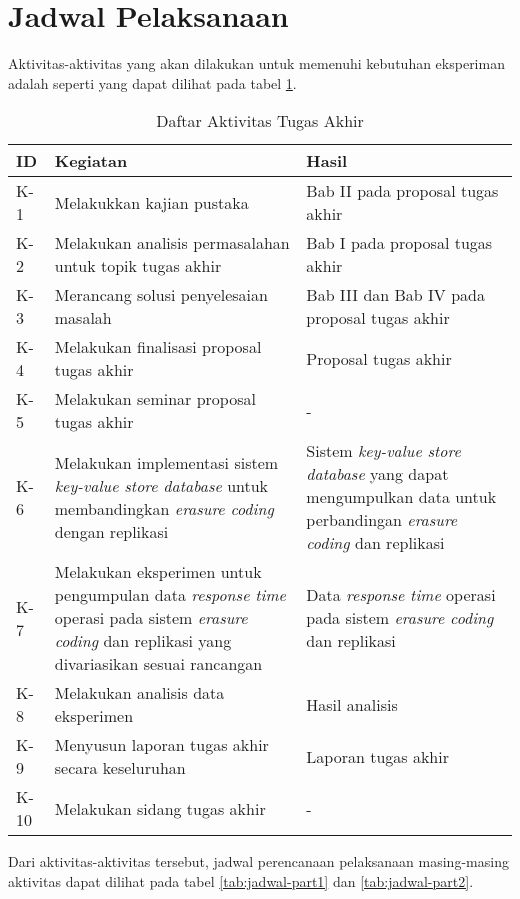 \section{Jadwal Pelaksanaan}
\label{sec:jadwal-pelaksanaan}
Aktivitas-aktivitas yang akan dilakukan untuk memenuhi kebutuhan eksperiman adalah seperti yang dapat dilihat pada tabel \ref{tab:rincian-aktivitas}.

\begin{table}[ht]
\centering
\caption{Daftar Aktivitas Tugas Akhir}
\begin{tabular}{|p{1cm}|p{6cm}|p{6cm}|}
\hline
\rowcolor{black!10} ID & Kegiatan & Hasil \\ \hline
K-1  & Melakukkan kajian pustaka & Bab II pada proposal tugas akhir \\ \hline
K-2  & Melakukan analisis permasalahan untuk topik tugas akhir & Bab I pada proposal tugas akhir \\ \hline
K-3  & Merancang solusi penyelesaian masalah & Bab III dan Bab IV pada proposal tugas akhir \\ \hline
K-4  & Melakukan finalisasi proposal tugas akhir & Proposal tugas akhir \\ \hline
K-5  & Melakukan seminar proposal tugas akhir & - \\ \hline
K-6  & Melakukan implementasi sistem \textit{key-value store database} untuk membandingkan \textit{erasure coding} dengan replikasi \textit{} & Sistem \textit{key-value store database} yang dapat mengumpulkan data untuk perbandingan \textit{erasure coding} dan replikasi \\ \hline
K-7  & Melakukan eksperimen untuk pengumpulan data \textit{response time} operasi pada sistem \textit{erasure coding} dan replikasi yang divariasikan sesuai rancangan & Data \textit{response time} operasi pada sistem \textit{erasure coding} dan replikasi \\ \hline
K-8  & Melakukan analisis data eksperimen & Hasil analisis \\ \hline
K-9  & Menyusun laporan tugas akhir secara keseluruhan & Laporan tugas akhir \\ \hline
K-10  & Melakukan sidang tugas akhir & - \\ \hline
\end{tabular}
\label{tab:rincian-aktivitas}
\end{table}

Dari aktivitas-aktivitas tersebut, jadwal perencanaan pelaksanaan masing-masing aktivitas dapat dilihat pada tabel \ref{tab:jadwal-part1} dan \ref{tab:jadwal-part2}.


